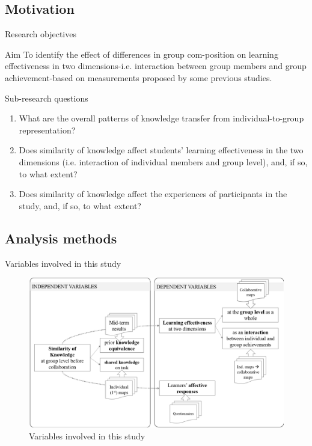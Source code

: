\subsection{Motivation}
\begin{frame}{Research objectives}

\begin{block}{Aim}
    To identify the effect of differences in group com-position on learning effectiveness in two dimensions-i.e.  interaction between group  members  and  group  achievement-based  on  measurements  proposed by some previous studies.
\end{block}

\begin{alertblock}{Sub-research questions}
    \begin{enumerate}
    \item What are the overall patterns of knowledge transfer from individual-to-group representation?
    \item Does similarity of knowledge affect students' learning
    effectiveness in the two dimensions (i.e. interaction of individual 
    members and group level), and, if so, to what extent?
    \item Does similarity of knowledge affect the experiences of
    participants in the study, and, if so, to what extent?
\end{enumerate}
\end{alertblock}

\end{frame}

\subsection{Analysis methods}
\begin{frame}{Variables involved in this study}
    \begin{figure}[tb]
     \begin{center}
      \includegraphics[width=120mm]{images/rqb_variables.pdf}
      \end{center}
      \caption{Variables involved in this study}
      \label{variables}  
\end{figure}
\end{frame}

